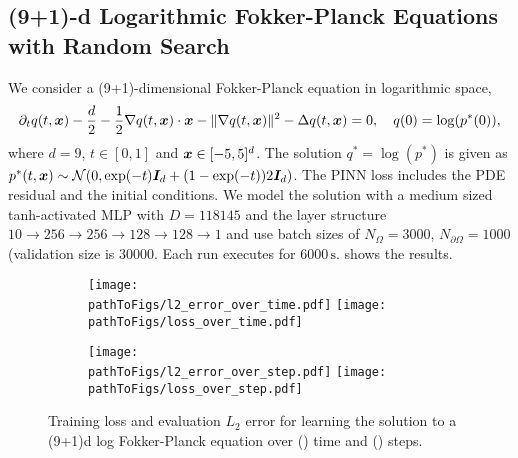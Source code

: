 \subsection{(9+1)-d Logarithmic Fokker-Planck Equations with Random Search}\label{sec:fokker10d-appendix}
We consider a (9+1)-dimensional Fokker-Planck equation in logarithmic space,
\begin{equation*}
  \partial_t q(t, {\bm{x}})
  -
  \frac{d}{2}
  -
  \frac12 \nabla q(t, {\bm{x}})\cdot {\bm{x}}
  -
  \| \nabla q(t, {\bm{x}}) \|^2
  -
  \Delta q(t, {\bm{x}})
  =
  0,
  \quad
  q(0) = \log (p^*(0)),
\end{equation*}
where $d=9$, $t\in[0, 1]$ and ${\bm{x}}\in[-5, 5]^d$.
The solution $q^*=\log(p^*)$ is given as $p^*(t, {\bm{x}}) \sim \mathcal N (0, \exp(-t){\bm{I}}_d + (1-\exp(-t))2{\bm{I}}_d)$.
The PINN loss includes the PDE residual and the initial conditions.
We model the solution with a medium sized tanh-activated MLP with $D=\num{118145}$ and the layer structure $10 \to 256 \to 256 \to 128 \to 128 \to 1$ and use batch sizes of $N_{\Omega} = \num{3000}$, $N_{\partial\Omega} = \num{1000}$ (validation size is $\num{30000}$.
Each run executes for $\num{6000}\,\text{s}$.
 shows the results.

\begin{figure}[!h]
  \centering
  \def\pathToFigs{kfac_pinns_exp/exp43_log_fokker_planck9d_isotropic_gaussian_random}
  \begin{subfigure}[t]{1.0\linewidth}
    \caption{}\label{subfig:fokker_10d-time}
    \texttt{[image: \\pathToFigs/l2\_error\_over\_time.pdf]}
    \texttt{[image: \\pathToFigs/loss\_over\_time.pdf]}
  \end{subfigure}
  \begin{subfigure}[t]{1.0\linewidth}
    \caption{}\label{subfig:fokker_10d-step}
    \texttt{[image: \\pathToFigs/l2\_error\_over\_step.pdf]}
    \texttt{[image: \\pathToFigs/loss\_over\_step.pdf]}
  \end{subfigure}
  \caption{Training loss and evaluation $L_2$ error for
  learning the solution to a (9+1)d log Fokker-Planck equation
  over () time and () steps.}\label{fig:fokker_10d-appendix}
\end{figure}

